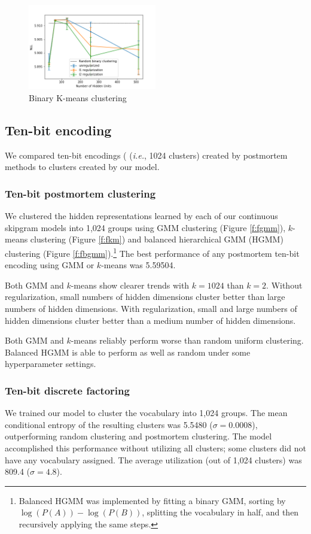 \documentclass[11pt,letterpaper]{article}
\begin{document}
\begin{figure}
  \caption{Binary K-means clustering}
\label{f:bkm}
  \centering
    \includegraphics[width=0.5\textwidth]{binary_km.png}
\end{figure}

\subsection{Ten-bit encoding}

We compared ten-bit encodings ( (\textit{i.e.}, 1024 clusters) created by postmortem methods to clusters created by our model.

\subsubsection{Ten-bit postmortem clustering}
We clustered the hidden representations learned by each of our continuous skipgram models into 1,024 groups using GMM clustering (Figure \ref{f:fgmm}), $k$-means clustering (Figure \ref{f:fkm}) and balanced hierarchical GMM (HGMM) clustering (Figure \ref{f:fbgmm}).\footnote{Balanced HGMM was implemented by fitting a binary GMM, sorting by $\log(P(A))-\log(P(B))$, splitting the vocabulary in half, and then recursively applying the same steps.} The best performance of any postmortem ten-bit encoding using GMM or $k$-means was 5.59504.

Both GMM and $k$-means show clearer trends with $k=1024$ than $k=2$. Without regularization, small numbers of hidden dimensions cluster better than large numbers of hidden dimensions. With regularization, small and large numbers of hidden dimensions cluster better than a medium number of hidden dimensions.

Both GMM and $k$-means reliably perform worse than random uniform clustering. Balanced HGMM is able to perform as well as random under some hyperparameter settings.

\subsubsection{Ten-bit discrete factoring}
We trained our model to cluster the vocabulary into 1,024 groups. The mean conditional entropy of the resulting clusters was 5.5480 ($\sigma=0.0008$), outperforming random clustering and postmortem clustering. The model accomplished this performance without utilizing all clusters; some clusters did not have any vocabulary assigned. The average utilization (out of 1,024 clusters) was 809.4 ($\sigma=4.8$).
\end{document}
